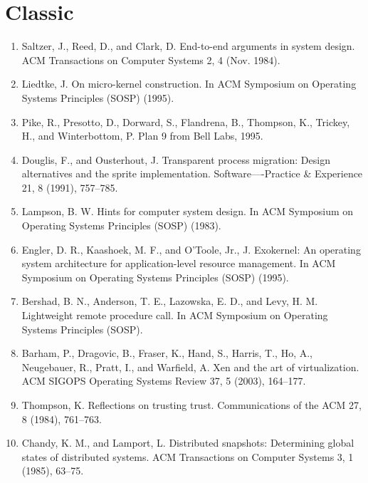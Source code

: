 \section{Classic}

\begin{enumerate}
\item  Saltzer, J., Reed, D., and Clark, D. End-to-end arguments in system design. ACM Transactions on Computer Systems 2, 4 (Nov. 1984).
\item Liedtke, J. On micro-kernel construction. In ACM Symposium on Operating Systems Principles (SOSP) (1995).
\item  Pike, R., Presotto, D., Dorward, S., Flandrena, B., Thompson, K., Trickey, H., and Winterbottom, P. Plan 9 from Bell Labs, 1995.
\item Douglis, F., and Ousterhout, J. Transparent process migration: Design
    alternatives and the sprite implementation. Software—-Practice \& Experience 21, 8 (1991), 757–785.
\item  Lampson, B. W. Hints for computer system design. In ACM Symposium on Operating Systems Principles (SOSP) (1983).
\item Engler, D. R., Kaashoek, M. F., and O’Toole, Jr., J. Exokernel: An operating system architecture for application-level resource management. In ACM Symposium on Operating Systems Principles (SOSP) (1995).
\item  Bershad, B. N., Anderson, T. E., Lazowska, E. D., and Levy, H. M. Lightweight remote procedure call. In ACM Symposium on Operating Systems Principles (SOSP).
\item  Barham, P., Dragovic, B., Fraser, K., Hand, S., Harris, T., Ho, A., Neugebauer, R., Pratt, I., and Warfield, A. Xen and the art of virtualization. ACM SIGOPS Operating Systems Review 37, 5 (2003), 164–177.
\item Thompson, K. Reflections on trusting trust. Communications of the ACM 27, 8 (1984), 761–763.
\item Chandy, K. M., and Lamport, L. Distributed snapshots: Determining global states of distributed systems. ACM Transactions on Computer Systems 3, 1 (1985), 63–75.
\end{enumerate}


